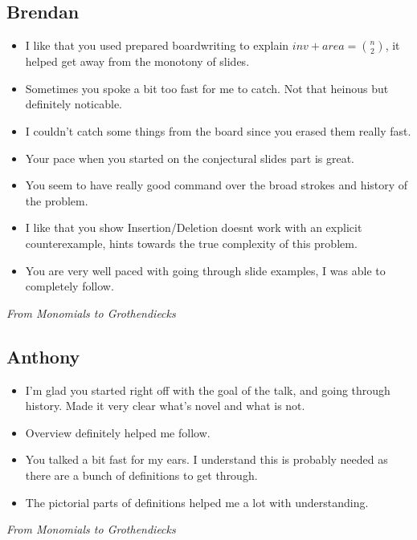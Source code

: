 \documentclass[12pt]{article}
\begin{document}
\subsection*{Brendan}
\begin{itemize}
  \item I like that you used prepared boardwriting to explain $ inv + area = \binom{n}{2} $, it helped get away from the monotony of slides.
  \item Sometimes you spoke a bit too fast for me to catch. Not that heinous but definitely noticable.
  \item I couldn't catch some things from the board since you erased them really fast.
  \item Your pace when you started on the conjectural slides part is great.
  \item You seem to have really good command over the broad strokes and history of the problem.
  \item I like that you show Insertion/Deletion doesnt work with an explicit counterexample, hints towards the true complexity of this problem.
  \item You are very well paced with going through slide examples, I was able to completely follow.
\end{itemize}

\newpage

\begin{center}
  \Large\textit{From Monomials to Grothendiecks}
\end{center}


\subsection*{Anthony}
\begin{itemize}
  \item I'm glad you started right off with the goal of the talk, and going through history. Made it very clear what's novel and what is not.
  \item Overview definitely helped me follow.
  \item You talked a bit fast for my ears. I understand this is probably needed as there are a bunch of definitions to get through.
  \item The pictorial parts of definitions helped me a lot with understanding.
\end{itemize}
\newpage

\begin{center}
  \Large\textit{From Monomials to Grothendiecks}
\end{center}
\end{document}
